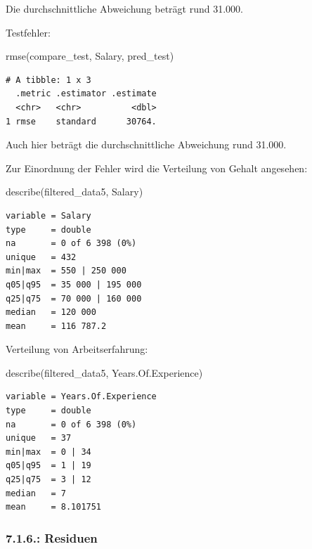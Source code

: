 \documentclass[
  letterpaper,
  DIV=11,
  numbers=noendperiod]{scrartcl}
\newenvironment{Shaded}{\begin{snugshade}}{\end{snugshade}}
\newcommand{\FunctionTok}[1]{\textcolor[rgb]{0.28,0.35,0.67}{#1}}
\newcommand{\NormalTok}[1]{\textcolor[rgb]{0.00,0.23,0.31}{#1}}
\begin{document}
Die durchschnittliche Abweichung beträgt rund 31.000.

Testfehler:

\begin{Shaded}
\begin{Highlighting}[]
\FunctionTok{rmse}\NormalTok{(compare\_test, Salary, pred\_test)}
\end{Highlighting}
\end{Shaded}

\begin{verbatim}
# A tibble: 1 x 3
  .metric .estimator .estimate
  <chr>   <chr>          <dbl>
1 rmse    standard      30764.
\end{verbatim}

Auch hier beträgt die durchschnittliche Abweichung rund 31.000.

Zur Einordnung der Fehler wird die Verteilung von Gehalt angesehen:

\begin{Shaded}
\begin{Highlighting}[]
\FunctionTok{describe}\NormalTok{(filtered\_data5, Salary)}
\end{Highlighting}
\end{Shaded}

\begin{verbatim}
variable = Salary
type     = double
na       = 0 of 6 398 (0%)
unique   = 432
min|max  = 550 | 250 000
q05|q95  = 35 000 | 195 000
q25|q75  = 70 000 | 160 000
median   = 120 000
mean     = 116 787.2
\end{verbatim}

Verteilung von Arbeitserfahrung:

\begin{Shaded}
\begin{Highlighting}[]
\FunctionTok{describe}\NormalTok{(filtered\_data5, Years.Of.Experience)}
\end{Highlighting}
\end{Shaded}

\begin{verbatim}
variable = Years.Of.Experience
type     = double
na       = 0 of 6 398 (0%)
unique   = 37
min|max  = 0 | 34
q05|q95  = 1 | 19
q25|q75  = 3 | 12
median   = 7
mean     = 8.101751
\end{verbatim}

\hypertarget{residuen}{%
\subsubsection{7.1.6.: Residuen}\label{residuen}}
\end{document}
